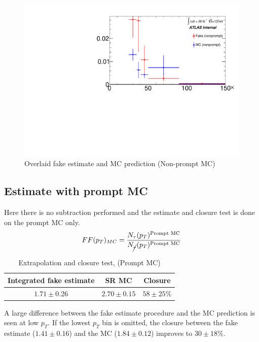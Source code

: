 \documentclass[11pt]{article}
\begin{document}
	\begin{figure}[H]
		\centering
		\includegraphics[width=0.7\linewidth]{figures/FakesEstimate_data_pp8_nonallhad_new_scaledHists/Overlay_FF_tau_pt_nonprompt.pdf}
		\caption{Overlaid fake estimate and MC prediction (Non-prompt MC)}
	\end{figure}	


	\clearpage
	\subsection{Estimate with prompt MC} 
	Here there is no subtraction performed and the estimate and closure test is done on the prompt MC only. 
	\begin{equation}
		FF(p_T)_{MC} = \frac{N_\tau (p_T)^{\text{Prompt MC}}}{N_{\cancel{\tau}} (p_T)^{\text{Prompt MC}}}
	\end{equation}

	\begin{table}[htp]
	\caption{Extrapolation and closure test, (Prompt MC)}
	\begin{center}
	\begin{tabular}{|c|c|c|}
	\hline
	Integrated fake estimate	& SR MC	& Closure \\
	\hline
	$1.71\pm0.26$ 		& $2.70\pm0.15$ 		& $58\pm25$\% \\
	\hline
	\end{tabular}
	\end{center}
	\label{default}
	\end{table}%

	A large difference between the fake estimate procedure and the MC prediction is seen at low $p_T$. If the lowest $p_T$ bin is omitted, the closure between the fake estimate ($1.41\pm0.16$) and the MC ($1.84\pm0.12$) improves to $30\pm18$\%. 
\end{document}
